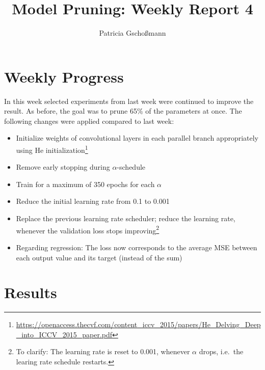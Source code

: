 \documentclass[10pt,twocolumn,letterpaper]{article}
\begin{document}
\title{Model Pruning: Weekly Report 4}
\author{Patricia Gschoßmann}

\maketitle

\section{Weekly Progress}
In this week selected experiments from last week were continued to improve the result.
As before, the goal was to prune 65\% of the parameters at once.
The following changes were applied compared to last week:
\begin{itemize}
	\item Initialize weights of convolutional layers in each parallel branch appropriately using He initialization\footnote{\url{https://openaccess.thecvf.com/content_iccv_2015/papers/He_Delving_Deep_into_ICCV_2015_paper.pdf}}
	\item Remove early stopping during $\alpha$-schedule
	\item Train for a maximum of 350 epochs for each $\alpha$
	\item Reduce the initial learning rate from 0.1 to 0.001
	\item Replace the previous learning rate scheduler; reduce the learning rate, whenever the validation loss stops improving\footnote{
			To clarify:
			The learning rate is reset to 0.001, whenever $\alpha$ drops, i.e.\ the learing rate schedule restarts.}
	\item Regarding regression: The loss now corresponds to the average MSE between each output value and its target (instead of the sum)
\end{itemize}

\section{Results}
\end{document}
